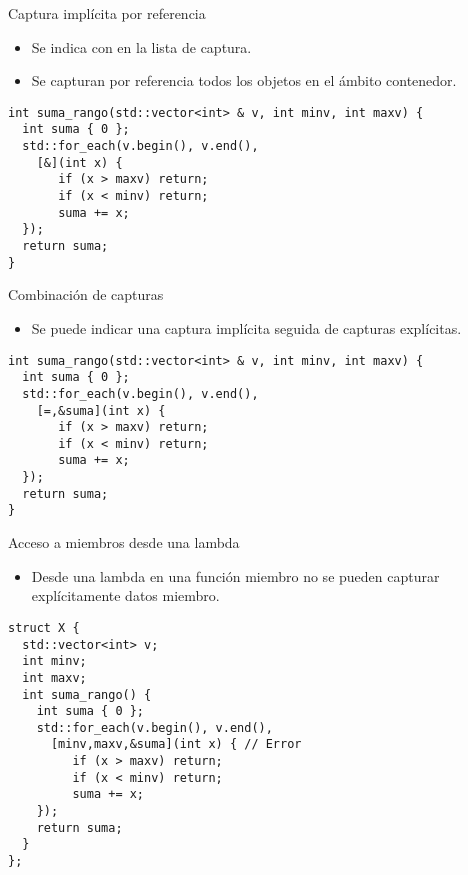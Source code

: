 \begin{frame}[t,fragile]{Captura implícita por referencia}
  \begin{itemize}
    \item Se indica con \cppid{\&} en la lista de captura.
    \item Se capturan por referencia todos los objetos en el ámbito contenedor.
  \end{itemize}
\pause
\begin{lstlisting}[escapechar=@]
int suma_rango(std::vector<int> & v, int minv, int maxv) {
  int suma { 0 };
  std::for_each(v.begin(), v.end(),
    [&](int x) {
       if (x > maxv) return;
       if (x < minv) return;
       suma += x;
  });
  return suma;
}
\end{lstlisting}
\end{frame}

\begin{frame}[t,fragile]{Combinación de capturas}
  \begin{itemize}
    \item Se puede indicar una captura implícita seguida de capturas explícitas.
  \end{itemize}
\pause
\begin{lstlisting}
int suma_rango(std::vector<int> & v, int minv, int maxv) {
  int suma { 0 };
  std::for_each(v.begin(), v.end(),
    [=,&suma](int x) {
       if (x > maxv) return;
       if (x < minv) return;
       suma += x;
  });
  return suma;
}
\end{lstlisting}
\end{frame}

\begin{frame}[t,fragile]{Acceso a miembros desde una lambda}
  \begin{itemize}
    \item Desde una lambda en una función miembro no se pueden capturar
    explícitamente datos miembro.
  \end{itemize}
\begin{lstlisting}
struct X {
  std::vector<int> v;
  int minv;
  int maxv;
  int suma_rango() {
    int suma { 0 };
    std::for_each(v.begin(), v.end(), 
      [minv,maxv,&suma](int x) { // Error
         if (x > maxv) return;
         if (x < minv) return;
         suma += x;
    });
    return suma;
  }
};
\end{lstlisting}
\end{frame}
 
